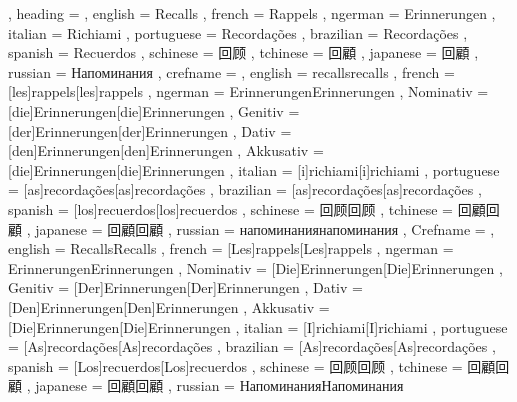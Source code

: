   {
    , heading =   {
                    , english     = Recalls
                    , french      = Rappels
                    , ngerman     = Erinnerungen
                    , italian     = Richiami
                    , portuguese  = Recordações
                    , brazilian   = Recordações
                    , spanish     = Recuerdos
                    , schinese    = 回顾
                    , tchinese    = 回顧
                    , japanese    = 回顧
                    , russian     = Напоминания
                  }
    , crefname =  {
                    , english     = {recalls}{recalls}
                    , french      = [les]{rappels}[les]{rappels}
                    , ngerman     = { {Erinnerungen}{Erinnerungen}
                                      , Nominativ = [die]{Erinnerungen}[die]{Erinnerungen}
                                      , Genitiv   = [der]{Erinnerungen}[der]{Erinnerungen}
                                      , Dativ     = [den]{Erinnerungen}[den]{Erinnerungen}
                                      , Akkusativ = [die]{Erinnerungen}[die]{Erinnerungen}
                                    }
                    , italian     = [i]{richiami}[i]{richiami}
                    , portuguese  = [as]{recordações}[as]{recordações}
                    , brazilian   = [as]{recordações}[as]{recordações}
                    , spanish     = [los]{recuerdos}[los]{recuerdos}
                    , schinese    = {回顾}{回顾}
                    , tchinese    = {回顧}{回顧}
                    , japanese    = {回顧}{回顧}
                    , russian     = {напоминания}{напоминания}
                  }
    , Crefname =  {
                    , english     = {Recalls}{Recalls}
                    , french      = [Les]{rappels}[Les]{rappels}
                    , ngerman     = { {Erinnerungen}{Erinnerungen}
                                      , Nominativ = [Die]{Erinnerungen}[Die]{Erinnerungen}
                                      , Genitiv   = [Der]{Erinnerungen}[Der]{Erinnerungen}
                                      , Dativ     = [Den]{Erinnerungen}[Den]{Erinnerungen}
                                      , Akkusativ = [Die]{Erinnerungen}[Die]{Erinnerungen}
                                    }
                    , italian     = [I]{richiami}[I]{richiami}
                    , portuguese  = [As]{recordações}[As]{recordações}
                    , brazilian   = [As]{recordações}[As]{recordações}
                    , spanish     = [Los]{recuerdos}[Los]{recuerdos}
                    , schinese    = {回顾}{回顾}
                    , tchinese    = {回顧}{回顧}
                    , japanese    = {回顧}{回顧}
                    , russian     = {Напоминания}{Напоминания}
                  }
  }

